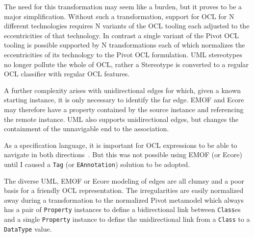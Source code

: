 \documentclass{jot}
\begin{document}
The need for this transformation may seem like a burden, but it proves to be a major simplification. Without such a transformation, support for OCL for N different technologies requires N variants of the OCL tooling each adjusted to the eccentricities of that technology. In contrast a single variant of the Pivot OCL tooling is possible supported by N transformations each of which normalizes the eccentricities of its technology to the Pivot OCL formulation. UML stereotypes no longer pollute the whole of OCL, rather a Stereotype is converted to a regular OCL classifier with regular OCL features.



A further complexity arises with unidirectional edges for which, given a known starting instance, it is only necessary to identify the far edge. EMOF and Ecore may therefore have a property contained by the source instance and referencing the remote instance. UML also supports unidirectional edges, but changes the containment of the unnavigable end to the association.

As a specification language, it is important for OCL expressions to be able to navigate in both directions~\cite{Willink-Opposites}. But this was not possible using EMOF (or Ecore) until I caused a \verb$Tag$ (or \verb$EAnnotation$) solution to be adopted.

The diverse UML, EMOF or Ecore modeling of edges are all clumsy and a poor basis for a friendly OCL representation. The irregularities are easily normalized away during a transformation to the normalized Pivot metamodel which always has a pair of \verb$Property$ instances to define a bidirectional link between \verb$Class$es and a single \verb$Property$ instance to define the unidirectional link from a \verb$Class$ to a \verb$DataType$ value.
\end{document}
